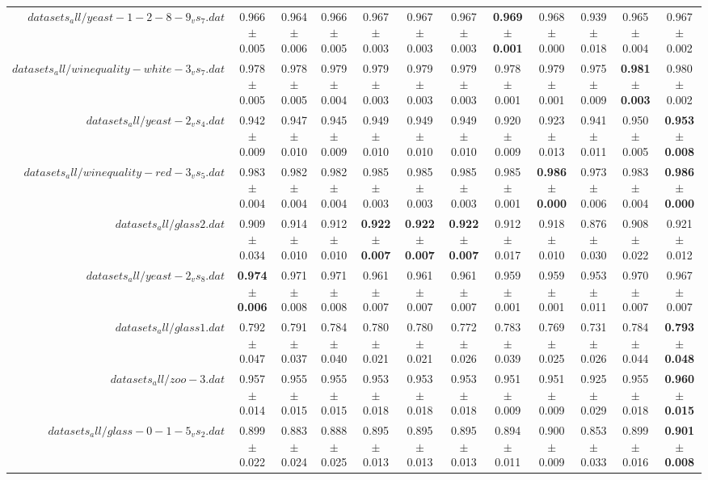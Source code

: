 \begin{table}[!ht]
{\begin{tabular}{r c c c c c c c c c c c}
$datasets_all/yeast-1-2-8-9_vs_7.dat$ & 0.966 $\pm$ 0.005 & 0.964 $\pm$ 0.006 & 0.966 $\pm$ 0.005 & 0.967 $\pm$ 0.003 & 0.967 $\pm$ 0.003 & 0.967 $\pm$ 0.003 & \textbf{0.969 $\pm$ 0.001} & 0.968 $\pm$ 0.000 & 0.939 $\pm$ 0.018 & 0.965 $\pm$ 0.004 & 0.967 $\pm$ 0.002 \\
$datasets_all/winequality-white-3_vs_7.dat$ & 0.978 $\pm$ 0.005 & 0.978 $\pm$ 0.005 & 0.979 $\pm$ 0.004 & 0.979 $\pm$ 0.003 & 0.979 $\pm$ 0.003 & 0.979 $\pm$ 0.003 & 0.978 $\pm$ 0.001 & 0.979 $\pm$ 0.001 & 0.975 $\pm$ 0.009 & \textbf{0.981 $\pm$ 0.003} & 0.980 $\pm$ 0.002 \\
$datasets_all/yeast-2_vs_4.dat$ & 0.942 $\pm$ 0.009 & 0.947 $\pm$ 0.010 & 0.945 $\pm$ 0.009 & 0.949 $\pm$ 0.010 & 0.949 $\pm$ 0.010 & 0.949 $\pm$ 0.010 & 0.920 $\pm$ 0.009 & 0.923 $\pm$ 0.013 & 0.941 $\pm$ 0.011 & 0.950 $\pm$ 0.005 & \textbf{0.953 $\pm$ 0.008} \\
$datasets_all/winequality-red-3_vs_5.dat$ & 0.983 $\pm$ 0.004 & 0.982 $\pm$ 0.004 & 0.982 $\pm$ 0.004 & 0.985 $\pm$ 0.003 & 0.985 $\pm$ 0.003 & 0.985 $\pm$ 0.003 & 0.985 $\pm$ 0.001 & \textbf{0.986 $\pm$ 0.000} & 0.973 $\pm$ 0.006 & 0.983 $\pm$ 0.004 & \textbf{0.986 $\pm$ 0.000} \\
$datasets_all/glass2.dat$ & 0.909 $\pm$ 0.034 & 0.914 $\pm$ 0.010 & 0.912 $\pm$ 0.010 & \textbf{0.922 $\pm$ 0.007} & \textbf{0.922 $\pm$ 0.007} & \textbf{0.922 $\pm$ 0.007} & 0.912 $\pm$ 0.017 & 0.918 $\pm$ 0.010 & 0.876 $\pm$ 0.030 & 0.908 $\pm$ 0.022 & 0.921 $\pm$ 0.012 \\
$datasets_all/yeast-2_vs_8.dat$ & \textbf{0.974 $\pm$ 0.006} & 0.971 $\pm$ 0.008 & 0.971 $\pm$ 0.008 & 0.961 $\pm$ 0.007 & 0.961 $\pm$ 0.007 & 0.961 $\pm$ 0.007 & 0.959 $\pm$ 0.001 & 0.959 $\pm$ 0.001 & 0.953 $\pm$ 0.011 & 0.970 $\pm$ 0.007 & 0.967 $\pm$ 0.007 \\
$datasets_all/glass1.dat$ & 0.792 $\pm$ 0.047 & 0.791 $\pm$ 0.037 & 0.784 $\pm$ 0.040 & 0.780 $\pm$ 0.021 & 0.780 $\pm$ 0.021 & 0.772 $\pm$ 0.026 & 0.783 $\pm$ 0.039 & 0.769 $\pm$ 0.025 & 0.731 $\pm$ 0.026 & 0.784 $\pm$ 0.044 & \textbf{0.793 $\pm$ 0.048} \\
$datasets_all/zoo-3.dat$ & 0.957 $\pm$ 0.014 & 0.955 $\pm$ 0.015 & 0.955 $\pm$ 0.015 & 0.953 $\pm$ 0.018 & 0.953 $\pm$ 0.018 & 0.953 $\pm$ 0.018 & 0.951 $\pm$ 0.009 & 0.951 $\pm$ 0.009 & 0.925 $\pm$ 0.029 & 0.955 $\pm$ 0.018 & \textbf{0.960 $\pm$ 0.015} \\
$datasets_all/glass-0-1-5_vs_2.dat$ & 0.899 $\pm$ 0.022 & 0.883 $\pm$ 0.024 & 0.888 $\pm$ 0.025 & 0.895 $\pm$ 0.013 & 0.895 $\pm$ 0.013 & 0.895 $\pm$ 0.013 & 0.894 $\pm$ 0.011 & 0.900 $\pm$ 0.009 & 0.853 $\pm$ 0.033 & 0.899 $\pm$ 0.016 & \textbf{0.901 $\pm$ 0.008} \\

\end{tabular}}
\end{table}
